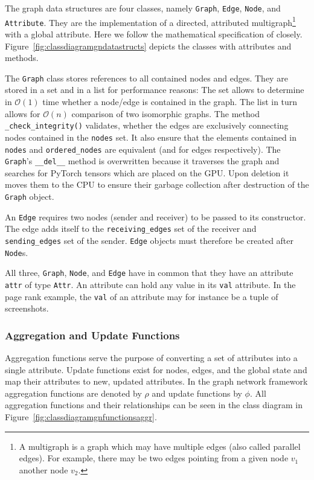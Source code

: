The graph data structures are four classes, namely \texttt{Graph}, \texttt{Edge}, \texttt{Node}, and \texttt{Attribute}. They are the implementation of a directed, attributed multigraph\footnote{A multigraph is a graph which may have multiple edges (also called parallel edges). For example, there may be two edges pointing from a given node $v_1$ another node $v_2$.} with a global attribute. Here we follow the mathematical specification of \cite{deepmind:graphnets} closely. Figure~\ref{fig:classdiagramgndatastructs} depicts the classes with attributes and methods.

The \texttt{Graph} class stores references to all contained nodes and edges. They are stored in a set and in a list for performance reasons: The set allows to determine in $\mathcal{O}(1)$ time whether a node/edge is contained in the graph. The list in turn allows for $\mathcal{O}(n)$ comparison of two isomorphic graphs. The method \texttt{\_check\_integrity()} validates, whether the edges are exclusively connecting nodes contained in the \texttt{nodes} set. It also ensure that the elements contained in \texttt{nodes} and \texttt{ordered\_nodes} are equivalent (and for edges respectively). The \texttt{Graph}'s \texttt{\_\_del\_\_} method is overwritten because it traverses the graph and searches for PyTorch tensors which are placed on the GPU. Upon deletion it moves them to the CPU to ensure their garbage collection after destruction of the \texttt{Graph} object.

An \texttt{Edge} requires two nodes (sender and receiver) to be passed to its constructor. The edge adds itself to the \texttt{receiving\_edges} set of the receiver and \texttt{sending\_edges} set of the sender. \texttt{Edge} objects must therefore be created after \texttt{Node}s.

All three, \texttt{Graph}, \texttt{Node}, and \texttt{Edge} have in common that they have an attribute \texttt{attr} of type \texttt{Attr}. An attribute can hold any value in its \texttt{val} attribute. In the page rank example, the \texttt{val} of an attribute may for instance be a tuple of screenshots.

\subsubsection{Aggregation and Update Functions}

Aggregation functions serve the purpose of converting a set of attributes into a single attribute. Update functions exist for nodes, edges, and the global state and map their attributes to new, updated attributes. In the graph network framework aggregation functions are denoted by $\rho$ and update functions by $\phi$. All aggregation functions and their relationships can be seen in the class diagram in Figure~\ref{fig:classdiagramgnfunctionsaggr}.

